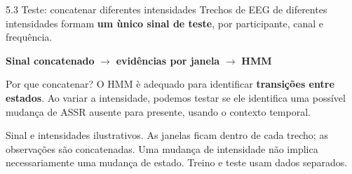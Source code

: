\documentclass{beamer}
\begin{document}
\begin{frame}{5.3 Teste: concatenar diferentes intensidades}
\small
Trechos de EEG de diferentes intensidades formam \textbf{um \`unico sinal de
teste}, por participante, canal e frequ\^encia.

\begin{center}

\vspace{0.15cm}
\textbf{Sinal concatenado} $\longrightarrow$ \textbf{evid\^encias por janela}
$\longrightarrow$ \textbf{HMM}
\end{center}

\begin{block}{Por que concatenar?}
O HMM \`e adequado para identificar \textbf{transi\c{c}\~oes entre estados}.
Ao variar a intensidade, podemos testar se ele identifica uma poss\'ivel
mudan\c{c}a de ASSR ausente para presente, usando o contexto temporal.
\end{block}

\footnotesize
Sinal e intensidades ilustrativos. As janelas ficam dentro de cada trecho;
as observa\c{c}\~oes s\~ao concatenadas. Uma mudan\c{c}a de intensidade n\~ao
implica necessariamente uma mudan\c{c}a de estado. Treino e teste usam dados separados.
\end{frame}
\end{document}
